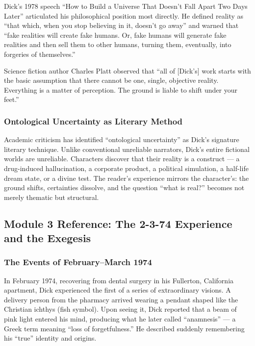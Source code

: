 \documentclass[11pt,letterpaper]{article}
\begin{document}
Dick's 1978 speech ``How to Build a Universe That Doesn't Fall Apart Two Days Later'' articulated his philosophical position most directly. He defined reality as ``that which, when you stop believing in it, doesn't go away'' and warned that ``fake realities will create fake humans. Or, fake humans will generate fake realities and then sell them to other humans, turning them, eventually, into forgeries of themselves.''

Science fiction author Charles Platt observed that ``all of [Dick's] work starts with the basic assumption that there cannot be one, single, objective reality. Everything is a matter of perception. The ground is liable to shift under your feet.''

\subsubsection{Ontological Uncertainty as Literary Method}

Academic criticism has identified ``ontological uncertainty'' as Dick's signature literary technique. Unlike conventional unreliable narrators, Dick's entire fictional worlds are unreliable. Characters discover that their reality is a construct --- a drug-induced hallucination, a corporate product, a political simulation, a half-life dream state, or a divine test. The reader's experience mirrors the character's: the ground shifts, certainties dissolve, and the question ``what is real?'' becomes not merely thematic but structural.

\subsection{Module 3 Reference: The 2-3-74 Experience and the Exegesis}

\subsubsection{The Events of February--March 1974}

In February 1974, recovering from dental surgery in his Fullerton, California apartment, Dick experienced the first of a series of extraordinary visions. A delivery person from the pharmacy arrived wearing a pendant shaped like the Christian ichthys (fish symbol). Upon seeing it, Dick reported that a beam of pink light entered his mind, producing what he later called ``anamnesis'' --- a Greek term meaning ``loss of forgetfulness.'' He described suddenly remembering his ``true'' identity and origins.
\end{document}
